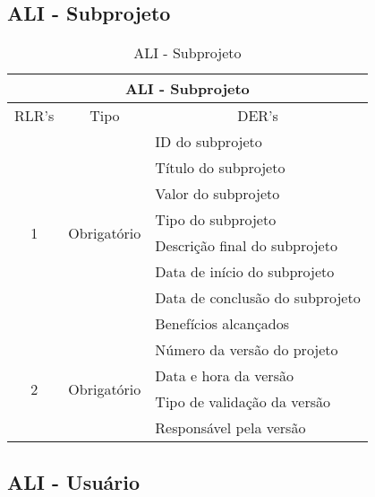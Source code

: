   \subsection{ALI - Subprojeto}
     \begin{table}[!h]
      \centering
      \caption{ALI - Subprojeto}
      \label{ali_projeto}
      \begin{tabular}{|c|c|l|}
      \hline
      \multicolumn{3}{|c|}{\textbf{ALI - Subprojeto}}                                                      \\ \hline
      \multicolumn{1}{|l|}{RLR's} & Tipo                         & \multicolumn{1}{c|}{DER's}  \\ \hline
      \multirow{8}{*}{1}          & \multirow{8}{*}{Obrigatório} & ID do subprojeto               \\ \cline{3-3} 
				  &                              & Título do subprojeto             \\ \cline{3-3} 
				  &                              & Valor do subprojeto      \\ \cline{3-3} 
				  &                              & Tipo do subprojeto          \\ \cline{3-3} 
				  &                              & Descrição final do subprojeto          \\ \cline{3-3} 
				  &                              & Data de início do subprojeto                  \\ \cline{3-3} 
				  &                              & Data de conclusão do subprojeto                 \\ \cline{3-3} 
				  &                              & Benefícios alcançados    \\ \hline
      \multirow{4}{*}{2}        & \multirow{4}{*}{Obrigatório} & Número da versão do projeto \\ \cline{3-3} 
				  &                              & Data e hora da versão       \\ \cline{3-3} 
				  &                              & Tipo de validação da versão \\ \cline{3-3} 
				  &                              & Responsável pela versão     \\ \hline
      \end{tabular}
      \end{table}
      
      


  \subsection{ALI - Usuário}
      
